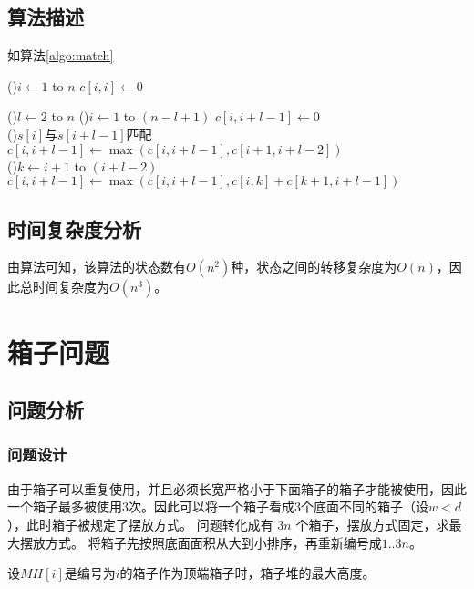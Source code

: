 \subsection{算法描述}

如算法\ref{algo:match}

\begin{algorithm}[H]
    \caption{$match(s[1..n])$}\label{algo:match}
    
    \For(){$i \leftarrow 1$ to $n$}{
        $c[i,i] \leftarrow 0$\\
    }

    \For(){$l \leftarrow 2$ to $n$}{
        \For(){$i \leftarrow 1$ to $(n-l+1)$}{
            $c[i,i+l-1]\leftarrow 0$\\
            \If(){$ s[i] \text{与} s[i+l-1]\text{匹配}$}{
                $c[i,i+l-1]\leftarrow \max(c[i,i+l-1], c[i+1,i+l-2])$\\
            }
            \For(){$k \leftarrow  i+1 $ to $(i+l-2)$}{
                $c[i,i+l-1]\leftarrow \max(c[i,i+l-1], c[i,k]+c[k+1, i+l-1])$
            }
        }
    }
\end{algorithm}

\subsection{时间复杂度分析}

由算法可知，该算法的状态数有$O(n^2)$种，状态之间的转移复杂度为$O(n)$，因此总时间复杂度为$O(n^3)$。

\section{箱子问题}
\subsection{问题分析}
\subsubsection{问题设计}
由于箱子可以重复使用，并且必须长宽严格小于下面箱子的箱子才能被使用，因此一个箱子最多被使用3次。因此可以将一个箱子看成3个底面不同的箱子（设$w < d$），此时箱子被规定了摆放方式。
问题转化成有 $3n$ 个箱子，摆放方式固定，求最大摆放方式。
将箱子先按照底面面积从大到小排序，再重新编号成$1..3n$。

设$MH[i]$是编号为$i$的箱子作为顶端箱子时，箱子堆的最大高度。

